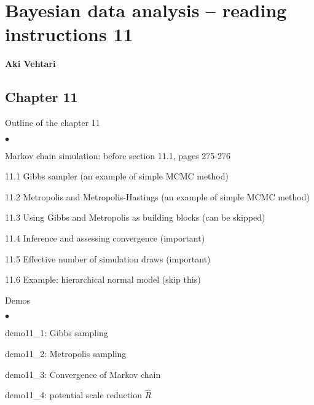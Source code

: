 \documentclass[a4paper,11pt,english]{article}
\begin{document}
\thispagestyle{empty}

\section*{Bayesian data analysis -- reading instructions 11} 
\smallskip
{\bf Aki Vehtari}
\smallskip

\subsection*{Chapter 11}

Outline of the chapter 11
\begin{list}{$\bullet$}{\parsep=0pt\itemsep=2pt}
\item Markov chain simulation: before section 11.1, pages 275-276
\item 11.1 Gibbs sampler (an example of simple MCMC method)
\item 11.2 Metropolis and Metropolis-Hastings (an example of simple MCMC method)
\item 11.3 Using Gibbs and Metropolis as building blocks (can be skipped)
\item 11.4 Inference and assessing convergence (important)
\item 11.5 Effective number of simulation draws (important)
\item 11.6 Example: hierarchical normal model (skip this)
\end{list}

Demos 
\begin{list}{$\bullet$}{\parsep=0pt\itemsep=2pt}
\item demo11\_1: Gibbs sampling
\item demo11\_2: Metropolis sampling
\item demo11\_3: Convergence of Markov chain
\item demo11\_4: potential scale reduction $\hat{R}$
\end{list}
\end{document}
